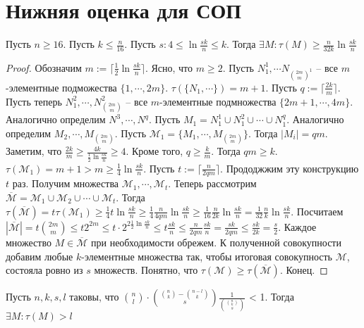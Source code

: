\documentclass[document.tex]{subfiles}
\begin{document}
\section{Нижняя оценка для СОП}
\begin{theorem}
    Пусть $n \geq 16$. Пусть $k \leq \frac{n}{16}$. Пусть $s: 4 \leq \ln \frac{sk}{n} \leq k$. Тогда $\exists M: \tau(M)
    \geq \frac{n}{32k} \ln \frac{sk}{n}$
\end{theorem} 
\begin{proof}
    Обозначим $m := \lceil \frac{1}{2} \ln \frac{sk}{n} \rceil$. Ясно, что $m \geq 2$. Пусть $N_1^1, \cdots
    N_{\binom{2m}{m}^1}$ -- все $m$-элементные подможества $\{1, \cdots, 2m\}$. $\tau(\{N_1, \cdots \}) = m+1$. Пусть $q
    := \lceil \frac{2k}{m} \rceil$. Пусть теперь $N_1^2, \cdots, N_{\binom{2m}{m}}^2$ -- все $m$-элементные подмножества
    $\{2m+1, \cdots, 4m\}$. Аналогично определим $N^3, \cdots, N^q$. Пусть $M_1 = N_1^1 \cup N_1^2 \cup \cdots \cup
    N_1^q$. Аналогично определим $M_2, \cdots, M_{\binom{2m}{m}}$. Пусть $\mathcal{M}_1 = \{M_1, \cdots,
    M_{\binom{2m}{m}}\}$. Тогда $|M_i| = qm$. Заметим, что $\frac{2k}{m} \geq \frac{4k}{\frac{1}{2}\ln
    \frac{sk}{n}} \geq 4$. Кроме того, $q \geq \frac{k}{m}$. Тогда $qm \geq k$. $\tau(\mathcal{M}_1) = m+1 > m \geq
    \frac{1}{4}\ln \frac{sk}{n}$. Пусть $t := \lceil \frac{n}{2qm} \rceil$. Прододжжим эту конструкцию $t$ раз.
    Получим множества $\mathcal{M}_1, \cdots, \mathcal{M}_t$. Теперь рассмотрим $\overline{\mathcal{M}} =
    \mathcal{M}_1 \cup \mathcal{M}_2 \cup \cdots \cup \mathcal{M}_t$. Тогда $\tau(\overline{\mathcal{M}}) = t
    \tau(\mathcal{M}_1) \geq \frac{1}{4}t\ln \frac{sk}{n} \geq \frac{1}{4}\frac{n}{4qm}\ln \frac{sk}{n} \geq
    \frac{1}{16}\frac{n}{2k}\ln \frac{sk}{n} = \frac{1}{32}\frac{n}{k}\ln \frac{sk}{n}$. Посчитаем
    $|\overline{\mathcal{M}}| = t\binom{2m}{m} \leq t 2^{2m} \leq t \cdot 2^{2 \frac{1}{2}\ln \frac{sk}{n}} \leq t
    \frac{sk}{n} \leq \frac{n}{2qm} \frac{sk}{n} = \frac{sk}{2qm} \leq \frac{sk}{2k} = \frac{s}{2}$. Каждое
    множество $M \in \overline{\mathcal{M}}$ при необходимости обрежем. К полученной совокупности добавим любые
    $k$-элементные множества так, чтобы итоговая совокупность $\mathcal{M}$, состояла ровно из $s$ множеств.
    Понятно, что $\tau(\mathcal{M}) \geq \tau(\overline{\mathcal{M}})$. Конец.
\end{proof}

\begin{theorem}
    Пусть $n, k, s, l$ таковы, что $\binom{n}{l} \cdot \binom{\binom{n}{k} - \binom{n - l}{k}}{s}
    \frac{1}{\binom{\binom{n}{k}}{s}}$ < 1. Тогда $\exists M: \tau(M) > l$
\end{theorem}
\end{document}
